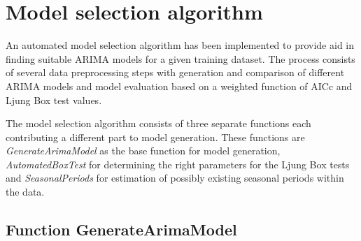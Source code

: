 \section{Model selection algorithm} \label{sec:model_selection_algorithm}

An automated model selection algorithm has been implemented to provide aid in finding suitable ARIMA models for a given training dataset. 
The process consists of several data preprocessing steps with generation and comparison of different ARIMA models and model evaluation based on a weighted function of AICc and Ljung Box test values. 

The model selection algorithm consists of three separate functions each contributing a different part to model generation. These functions are \textit{GenerateArimaModel} as the base function for model generation, \textit{AutomatedBoxTest} for determining the right parameters for the Ljung Box tests and \textit{SeasonalPeriods} for estimation of possibly existing seasonal periods within the data. 


\subsection{Function GenerateArimaModel}

